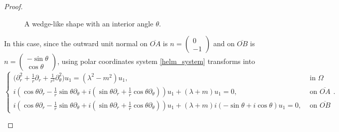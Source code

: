 \begin{proof}
\begin{enumerate}
\begin{figure}[H]
    \caption{A wedge-like shape with an interior angle \(\theta\).}
    \label{wedge_dirac}
    \end{figure}
    In this case, since the outward unit normal on \(\overline{OA}\) is \(n =\begin{pmatrix}
        0\\
        -1
    \end{pmatrix}\) and on \(\overline{OB}\) is \(n =\begin{pmatrix}
        -\sin \theta\\
        \cos \theta
    \end{pmatrix}\), using polar coordinates system \eqref{helm_system} transforms into
    \begin{equation}\label{helm_polar_wedge}
        \begin{cases}
            \Big(\partial_r^2 + \frac{1}{r}\partial_r +\frac{1}{r^2}\partial_\theta^2 \Big)u_1 = (\lambda^2 - m^2)u_1, & \text{ in } \Omega\\
             i (\cos \theta\partial_r -\frac{1}{r}\sin \theta \partial_\theta + i(\sin \theta\partial_r +\frac{1}{r}\cos \theta \partial_\theta))u_1 + (\lambda + m)u_1 = 0, & \text{ on } \overline{OA}\\
             i (\cos \theta\partial_r -\frac{1}{r}\sin \theta \partial_\theta + i(\sin \theta\partial_r +\frac{1}{r}\cos \theta \partial_\theta))u_1 + (\lambda + m)i(-\sin \theta + i \cos \theta)u_1 = 0, & \text{ on } \overline{OB}
        \end{cases}.      
    \end{equation}


\end{enumerate}
\end{proof}

